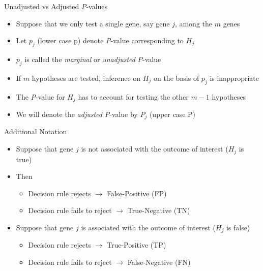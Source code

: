 \documentclass[xcolor=x11names,compress]{beamer}\usepackage[]{graphicx}\usepackage[]{color}
\begin{document}
\begin{frame}{Unadjusted vs Adjusted {\it P}-values}
  \begin{itemize}
  \item Suppose that we only test a single gene, say gene $j$, among the $m$
        genes
  \item Let $p_j$ (lower case p) denote {\it P}-value corresponding to $H_j$
  \item $p_j$ is called the {\it marginal} or {\it unadjusted} {\it P}-value
  \item If $m$ hypotheses are tested, inference on $H_j$ on the basis of
        $p_j$ is inappropriate
  \item The {\it P}-value for $H_j$ has to account for testing the other $m-1$ hypotheses
  \item We will denote the {\it adjusted} {\it P}-value by  $P_j$ (upper case P)
  \end{itemize}
\end{frame}


\begin{frame}{Additional Notation}
  \begin{itemize}
  \item Suppose that gene $j$ is not associated with the outcome of interest ($H_j$ is true)
  \item Then
    \begin{itemize}
    \item Decision rule rejects $\to$ False-Positive (FP) 
    \item Decision rule fails to reject $\to$ True-Negative (TN) 
    \end{itemize}
  \item Suppose that gene $j$ is associated with the outcome of interest ($H_j$ is false)
  \begin{itemize}
    \item Decision rule rejects $\to$ True-Positive (TP) 
    \item Decision rule fails to reject $\to$  False-Negative (FN) 
    \end{itemize}
  \end{itemize}
\end{frame}
\end{document}
